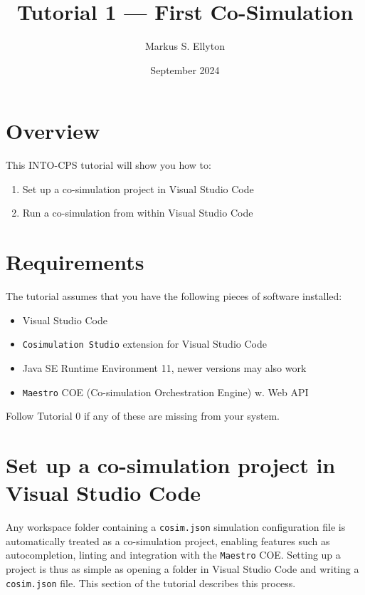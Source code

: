 \documentclass[11pt,a4paper]{../tutorial}
\title{Tutorial 1 --- First Co-Simulation}
\date{September 2024}
\author{Markus S. Ellyton}
\newcommand{\cosimext}{\texttt{Cosimulation Studio}\xspace}
\newcommand{\maestro}{\texttt{Maestro}\xspace}
\begin{document}
\section*{Overview}

This INTO-CPS tutorial will show you how to:

\begin{enumerate}[noitemsep]
\item Set up a co-simulation project in Visual Studio Code
\item Run a co-simulation from within Visual Studio Code
\end{enumerate}

\section*{Requirements}

The tutorial assumes that you have the following pieces of software installed:

\begin{itemize}[noitemsep]
	\item Visual Studio Code
	\item \cosimext{} extension for Visual Studio Code
	\item Java SE Runtime Environment 11, newer versions may also work
	\item \maestro{} COE (Co-simulation Orchestration Engine) w. Web API
\end{itemize}

Follow Tutorial 0 if any of these are missing from your system.

\section{Set up a co-simulation project in Visual Studio Code}

Any workspace folder containing a \texttt{cosim.json} simulation configuration file is automatically treated as a co-simulation project, enabling features such as autocompletion, linting and integration with the \maestro COE. Setting up a project is thus as simple as opening a folder in Visual Studio Code and writing a \texttt{cosim.json} file. This section of the tutorial describes this process.


\end{document}
